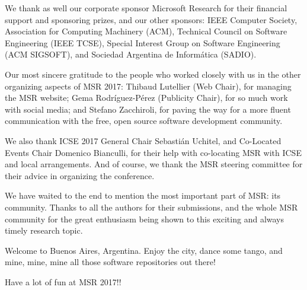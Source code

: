\documentclass[a4paper]{report}
\begin{document}
We thank as well our corporate sponsor Microsoft Research for their financial support and sponsoring prizes, and our other sponsors: IEEE Computer Society, Association for Computing Machinery (ACM), Technical Council on Software Engineering (IEEE TCSE), Special Interest Group on Software Engineering (ACM SIGSOFT), and Sociedad Argentina de Informática (SADIO). 

Our most sincere gratitude to the people who worked closely with us in the other organizing aspects of MSR 2017: Thibaud Lutellier (Web Chair), for managing the MSR website; Gema Rodríguez-Pérez (Publicity Chair), for so much work with social media; and Stefano Zacchiroli, for paving the way for a more fluent communication with the free, open source software development community.

We also thank ICSE 2017 General Chair Sebastián Uchitel, and Co-Located Events Chair Domenico Bianculli, for their help with co-locating MSR with ICSE and local arrangements. And of course, we thank the MSR steering committee for their advice in organizing the conference.

We have waited to the end to mention the most important part of MSR: its community. Thanks to all the authors for their submissions, and the whole MSR community for the great enthusiasm being shown to this exciting and always timely research topic.

Welcome to Buenos Aires, Argentina. Enjoy the city, dance some tango, and mine, mine, mine all those software repositories out there!

Have a lot of fun at MSR 2017!!





\end{document}
